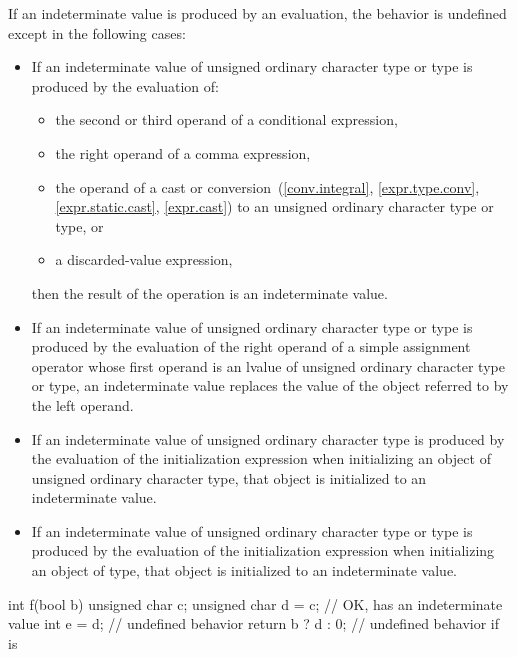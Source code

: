 \pnum
If an indeterminate value is produced by an evaluation,
the behavior is undefined except in the following cases:
\begin{itemize}
\item
  If an indeterminate value of
  unsigned ordinary character type
  or  type
  is produced by the evaluation of:
  \begin{itemize}
  \item
    the second or third operand of a conditional expression,
  \item
    the right operand of a comma expression,
  \item
    the operand of a cast or conversion~(\ref{conv.integral},
    \ref{expr.type.conv}, \ref{expr.static.cast}, \ref{expr.cast})
    to an unsigned ordinary character type
    or  type, or
  \item
    a discarded-value expression,
  \end{itemize}
  then the result of the operation is an indeterminate value.
\item
  If an indeterminate value of
  unsigned ordinary character type or  type
  is produced by the evaluation of
  the right operand of a simple assignment operator
  whose first operand is an lvalue of
  unsigned ordinary character type or  type,
  an indeterminate value replaces
  the value of the object referred to by the left operand.
\item
  If an indeterminate value of unsigned ordinary character type
  is produced by the evaluation of the initialization expression
  when initializing an object of unsigned ordinary character type,
  that object is initialized to an indeterminate
  value.
\item
  If an indeterminate value of
  unsigned ordinary character type or  type
  is produced by the evaluation of the initialization expression
  when initializing an object of  type,
  that object is initialized to an indeterminate value.
\end{itemize}
\begin{example}
\begin{codeblock}
int f(bool b) {
  unsigned char c;
  unsigned char d = c;          // OK,  has an indeterminate value
  int e = d;                    // undefined behavior
  return b ? d : 0;             // undefined behavior if  is 
}
\end{codeblock}
\end{example}

